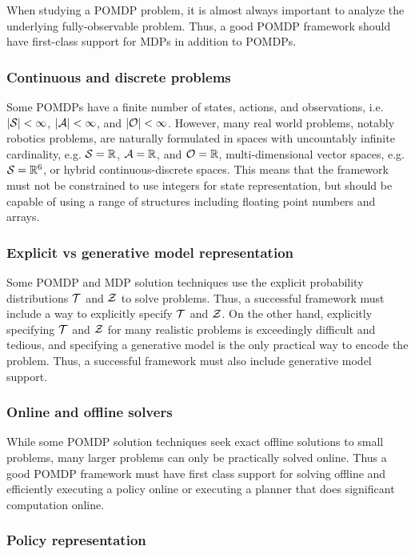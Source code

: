 When studying a POMDP problem, it is almost always important to analyze the underlying fully-observable problem.
Thus, a good POMDP framework should have first-class support for MDPs in addition to POMDPs.

\subsubsection{Continuous and discrete problems}

Some POMDPs have a finite number of states, actions, and observations, i.e. $|\mathcal{S}| < \infty$, $|\mathcal{A}| < \infty$, and $|\mathcal{O}| < \infty$.
However, many real world problems, notably robotics problems, are naturally formulated in spaces with uncountably infinite cardinality, e.g. $\mathcal{S} = \mathbb{R}$, $\mathcal{A} = \mathbb{R}$, and $\mathcal{O} = \mathbb{R}$, multi-dimensional vector spaces, e.g. $\mathcal{S} = \mathbb{R}^6$, or hybrid continuous-discrete spaces.
This means that the framework must not be constrained to use integers for state representation, but should be capable of using a range of structures including floating point numbers and arrays.

\subsubsection{Explicit vs generative model representation}

Some POMDP and MDP solution techniques use the explicit probability distributions $\mathcal{T}$ and $\mathcal{Z}$ to solve problems.
Thus, a successful framework must include a way to explicitly specify $\mathcal{T}$ and $\mathcal{Z}$.
On the other hand, explicitly specifying $\mathcal{T}$ and $\mathcal{Z}$ for many realistic problems is exceedingly difficult and tedious, and specifying a generative model is the only practical way to encode the problem.
Thus, a successful framework must also include generative model support.

\subsubsection{Online and offline solvers}

While some POMDP solution techniques seek exact offline solutions to small problems, many larger problems can only be practically solved online.
Thus a good POMDP framework must have first class support for solving offline and efficiently executing a policy online or executing a planner that does significant computation online.

\subsubsection{Policy representation}

